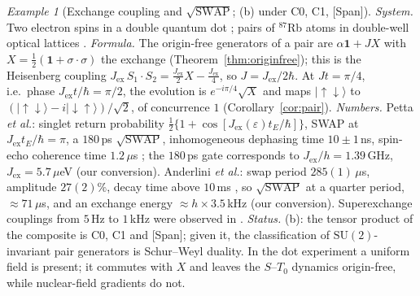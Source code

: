 \documentclass[aps,pra,onecolumn,superscriptaddress,nofootinbib,10pt]{revtex4-2}
\theoremstyle{definition}
\theoremstyle{remark}
\newtheorem{example}[theorem]{Example}
\newcommand{\SU}{\mathrm{SU}}
\begin{document}
\begin{example}[Exchange coupling and $\sqrt{\mathrm{SWAP}}$; (b) under C0, C1, {[Span]}]\label{ex:exchange}
\emph{System.}  Two electron spins in a double quantum dot \cite{ex-LD98,ex-Petta05}; pairs of ${}^{87}$Rb atoms in
double-well optical lattices \cite{ex-Anderlini07,ex-Trotzky08}.
\emph{Formula.}  The origin-free generators of a pair are $\alpha\mathbf1+JX$ with $X=\tfrac12(\mathbf1+\sigma\cdot\sigma)$ the
exchange (Theorem~\ref{thm:originfree}); this is the Heisenberg coupling
$J_{\mathrm{ex}}\,S_1\!\cdot S_2=\tfrac{J_{\mathrm{ex}}}2X-\tfrac{J_{\mathrm{ex}}}4$, so $J=J_{\mathrm{ex}}/2\hbar$.  At $Jt=\pi/4$, i.e.\ phase
$J_{\mathrm{ex}}t/\hbar=\pi/2$, the evolution is $e^{-i\pi/4}\sqrt X$ and maps $\lvert{\uparrow\downarrow}\rangle$ to
$(\lvert{\uparrow\downarrow}\rangle-i\lvert{\downarrow\uparrow}\rangle)/\sqrt2$, of concurrence $1$ (Corollary~\ref{cor:pair}).
\emph{Numbers.}  Petta \emph{et al.}: singlet return probability $\tfrac12\{1+\cos[J_{\mathrm{ex}}(\varepsilon)t_E/\hbar]\}$, SWAP at
$J_{\mathrm{ex}}t_E/\hbar=\pi$, a $180$\,ps $\sqrt{\mathrm{SWAP}}$, inhomogeneous dephasing time $10\pm1$\,ns, spin-echo
coherence time $1.2\,\mu$s \cite{ex-Petta05}; the $180$\,ps gate corresponds to $J_{\mathrm{ex}}/h=1.39$\,GHz,
$J_{\mathrm{ex}}=5.7\,\mu$eV (our conversion).  Anderlini \emph{et al.}: swap period $285(1)\,\mu$s, amplitude
$27(2)\%$, decay time above $10$\,ms \cite{ex-Anderlini07}, so $\sqrt{\mathrm{SWAP}}$ at a quarter period,
$\approx71\,\mu$s, and an exchange energy $\approx h\times3.5$\,kHz (our conversion).  Superexchange couplings from
$5$\,Hz to $1$\,kHz were observed in \cite{ex-Trotzky08}.
\emph{Status.}  (b): the tensor product of the composite is C0, C1 and [Span]; given it, the
classification of $\SU(2)$-invariant pair generators is Schur--Weyl duality.  In the dot experiment a
uniform field is present; it commutes with $X$ and leaves the $S$--$T_0$ dynamics origin-free, while
nuclear-field gradients do not.
\end{example}
\end{document}
